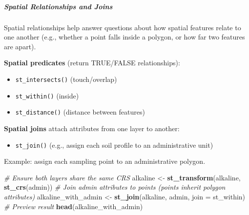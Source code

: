 \documentclass[
  10pt,
  b5paper,
  oneside]{book}
\newenvironment{Shaded}{\begin{snugshade}}{\end{snugshade}}
\newcommand{\AttributeTok}[1]{\textcolor[rgb]{0.13,0.29,0.53}{#1}}
\newcommand{\CommentTok}[1]{\textcolor[rgb]{0.56,0.35,0.01}{\textit{#1}}}
\newcommand{\FunctionTok}[1]{\textcolor[rgb]{0.13,0.29,0.53}{\textbf{#1}}}
\newcommand{\NormalTok}[1]{#1}
\newcommand{\OtherTok}[1]{\textcolor[rgb]{0.56,0.35,0.01}{#1}}
\providecommand{\tightlist}{%
  \setlength{\itemsep}{0pt}\setlength{\parskip}{0pt}}
\begin{document}
\subparagraph*{Spatial Relationships and Joins}\label{spatial-relationships-and-joins}

Spatial relationships help answer questions about how spatial features relate to one another (e.g., whether a point falls inside a polygon, or how far two features are apart).

\textbf{Spatial predicates} (return TRUE/FALSE relationships):

\begin{itemize}
\item
  \texttt{st\_intersects()} (touch/overlap)
\item
  \texttt{st\_within()} (inside)
\item
  \texttt{st\_distance()} (distance between features)
\end{itemize}

\textbf{Spatial joins} attach attributes from one layer to another:

\begin{itemize}
\tightlist
\item
  \texttt{st\_join()} (e.g., assign each soil profile to an administrative unit)
\end{itemize}

Example: assign each sampling point to an administrative polygon.

\begin{Shaded}
\begin{Highlighting}[]
\CommentTok{\# Ensure both layers share the same CRS}
\NormalTok{alkaline }\OtherTok{\textless{}{-}} \FunctionTok{st\_transform}\NormalTok{(alkaline, }\FunctionTok{st\_crs}\NormalTok{(admin))}
\CommentTok{\# Join admin attributes to points (points inherit polygon attributes)}
\NormalTok{alkaline\_with\_admin }\OtherTok{\textless{}{-}} \FunctionTok{st\_join}\NormalTok{(alkaline, admin, }\AttributeTok{join =}\NormalTok{ st\_within)}
\CommentTok{\# Preview result}
\FunctionTok{head}\NormalTok{(alkaline\_with\_admin)}
\end{Highlighting}
\end{Shaded}
\end{document}
